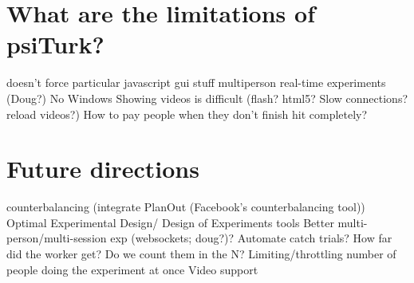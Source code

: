 \documentclass[jou,apacite]{apa6}
\begin{document}
\section{What are the limitations of psiTurk?}
doesn't force particular javascript gui stuff
multiperson real-time experiments (Doug?) 
No Windows
Showing videos is difficult (flash? html5? Slow connections? reload videos?)
How to pay people when they don't finish hit completely?

\section{Future directions}
counterbalancing (integrate PlanOut (Facebook's counterbalancing tool))
Optimal Experimental Design/ Design of Experiments tools
Better multi-person/multi-session exp (websockets; doug?)?
Automate catch trials? How far did the worker get? Do we count them in the N? 
Limiting/throttling number of people doing the experiment at once
Video support


\end{document}
